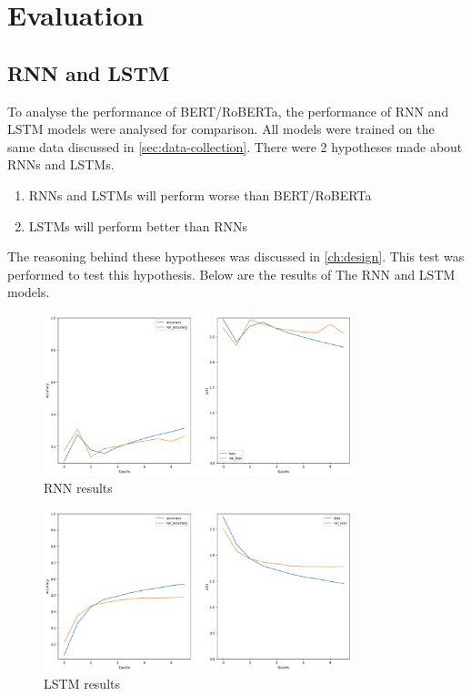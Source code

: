 \chapter{Evaluation}
\label{ch:evaluation}

\section{RNN and LSTM}
\label{sec:rnn-lstm}
To analyse the performance of BERT/RoBERTa, the performance of RNN and LSTM models were analysed for comparison. All models
were trained on the same data discussed in \cref{sec:data-collection}. There were 2 hypotheses made about RNNs and LSTMs. 
\begin{enumerate}
    \item RNNs and LSTMs will perform worse than BERT/RoBERTa
    \item LSTMs will perform better than RNNs
\end{enumerate}
The reasoning behind these hypotheses was discussed in \cref{ch:design}.
This test was performed to test this hypothesis. Below are the results of The RNN and LSTM models.
\begin{figure}[hbtp]
    \centering
    \includegraphics[width=0.8\textwidth]{../images/rnn-acc.png}
    \caption{RNN results}
    \label{fig:rnn-acc}
\end{figure}
\begin{figure}[hbtp]
    \centering
    \includegraphics[width=0.8\textwidth]{../images/lstm-acc.png}
    \caption{LSTM results}
    \label{fig:lstm-acc}
\end{figure}

